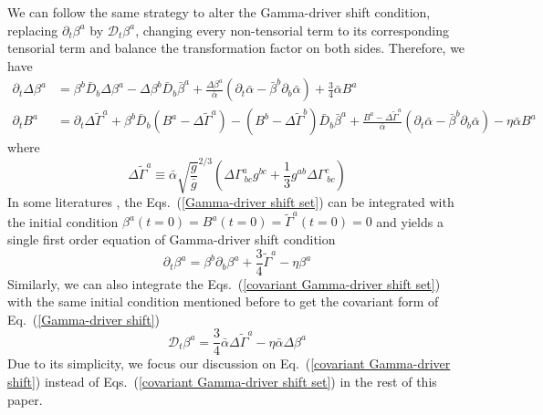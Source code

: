 \documentclass[letterpaper,nofootinbib,prd,amsmath,onecolumn]{revtex4-1}
\begin{document}
We can follow the same strategy to alter the Gamma-driver shift condition, replacing $\partial_{t}\beta^{a}$ by $\mathscr{D}_{t}\beta^{a}$, changing every non-tensorial term to its corresponding tensorial term and balance the transformation factor on both sides. Therefore, we have
\begin{subequations}\label{covariant Gamma-driver shift set}
\begin{align}
\partial_{t}\Delta \beta^{a} & = \beta^{b}{\bar D}_{b}\Delta\beta^{a} - \Delta \beta^{b}{\bar D}_{b}{\bar \beta}^{a} + \frac{\Delta\beta^{a}}{{\bar \alpha}}\left(\partial_{t}{\bar \alpha} - {\bar \beta}^{b}\partial_{b}{\bar \alpha}\right) + \frac{3}{4}{\bar \alpha}B^{a}\\
\partial_{t}B^{a} & = \partial_{t}\Delta {\tilde \Gamma}^{a} + \beta^{b}{\bar D}_{b}\left(B^{a} - \Delta{\tilde \Gamma}^{a}\right) - \left(B^{b} - \Delta{\tilde \Gamma}^{b}\right){\bar D}_{b}{\bar \beta}^{a} + \frac{B^{a} - \Delta{\tilde \Gamma}^{a}}{{\bar \alpha}}\left(\partial_{t}{\bar \alpha} - {\bar \beta}^{b}\partial_{b}{\bar \alpha}\right) - \eta{\bar \alpha}B^{a}
\end{align}
\end{subequations}
where
\begin{equation}
\Delta {\tilde \Gamma}^{a} \equiv {\bar \alpha}\sqrt{\frac{g}{{\bar g}}}^{2/3}\left(\Delta \Gamma^{a}_{~bc}g^{bc} + \frac{1}{3}g^{ab}\Delta \Gamma^{c}_{~bc}\right)
\end{equation}
In some literatures \cite{vanMeter:2006vi}, the Eqs.~(\ref{Gamma-driver shift set}) can be integrated with the initial condition $\beta^{a}\left(t=0\right) = B^{a}\left(t=0\right) = {\tilde \Gamma}^{a}\left(t = 0\right) = 0$ and yields a single first order equation of Gamma-driver shift condition
\begin{equation}\label{Gamma-driver shift}
\partial_{t}\beta^{a} = \beta^{b}\partial_{b}\beta^{a} + \frac{3}{4}{\tilde \Gamma}^{a} - \eta \beta^{a}
\end{equation} 
Similarly, we can also integrate the Eqs.~(\ref{covariant Gamma-driver shift set}) with the same initial condition mentioned before to get the covariant form of Eq.~(\ref{Gamma-driver shift})
\begin{equation}\label{covariant Gamma-driver shift}
\mathscr{D}_{t}\beta^{a} = \frac{3}{4}{\bar \alpha}\Delta {\tilde \Gamma}^{a} - \eta {\bar \alpha}\Delta\beta^{a}
\end{equation}
Due to its simplicity, we focus our discussion on Eq.~(\ref{covariant Gamma-driver shift}) instead of Eqs.~(\ref{covariant Gamma-driver shift set}) in the rest of this paper.
\end{document}
